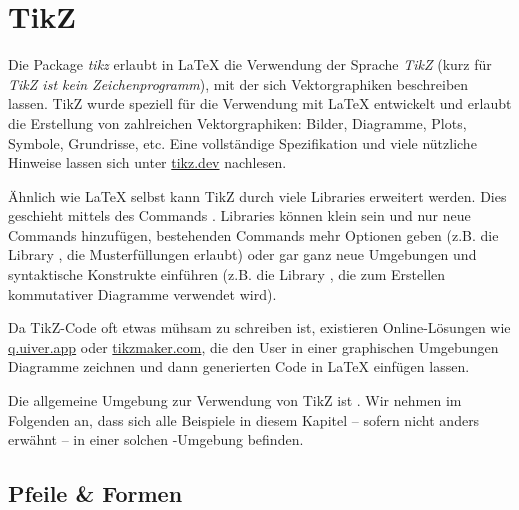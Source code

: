 \chapter{TikZ}

Die Package \emph{tikz} erlaubt in \LaTeX{} die Verwendung der Sprache \emph{TikZ} (kurz für \emph{TikZ ist kein Zeichenprogramm}), mit der sich Vektorgraphiken beschreiben lassen.
TikZ wurde speziell für die Verwendung mit \LaTeX{} entwickelt und erlaubt die Erstellung von zahlreichen Vektorgraphiken: Bilder, Diagramme, Plots, Symbole, Grundrisse, etc.
Eine vollständige Spezifikation und viele nützliche Hinweise lassen sich unter \url{tikz.dev} nachlesen.

Ähnlich wie \LaTeX{} selbst kann TikZ durch viele Libraries erweitert werden.
Dies geschieht mittels des Commands .
Libraries können klein sein und nur neue Commands hinzufügen, bestehenden Commands mehr Optionen geben (z.B. die Library , die Musterfüllungen erlaubt) oder gar ganz neue Umgebungen und syntaktische Konstrukte einführen (z.B. die Library , die zum Erstellen kommutativer Diagramme verwendet wird).

Da TikZ-Code oft etwas mühsam zu schreiben ist, existieren Online-Lösungen wie \url{q.uiver.app} oder \url{tikzmaker.com}, die den User in einer graphischen Umgebungen Diagramme zeichnen und dann generierten Code in \LaTeX{} einfügen lassen.

Die allgemeine Umgebung zur Verwendung von TikZ ist .
Wir nehmen im Folgenden an, dass sich alle Beispiele in diesem Kapitel -- sofern nicht anders erwähnt -- in einer solchen -Umgebung befinden.

\section{Pfeile \& Formen}

